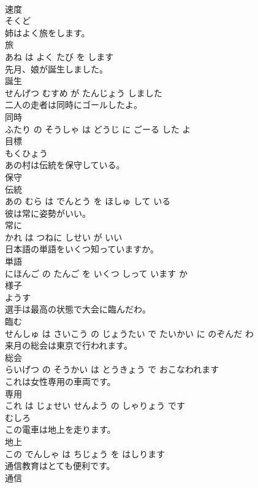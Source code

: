 \documentclass[8pt]{extreport}
\begin{document}
\begin{CJK}{UTF8}{min}
\\	速度	
\\	そくど		
\\	姉はよく旅をします。	
\\	旅 
\\	あね は よく たび を します			
\\	先月、娘が誕生しました。	
\\	誕生 
\\	せんげつ むすめ が たんじょう しました			
\\	二人の走者は同時にゴールしたよ。	
\\	同時 
\\	ふたり の そうしゃ は どうじ に ごーる した よ			
\\	目標	
\\	もくひょう		
\\	あの村は伝統を保守している。	
\\	保守 
\\	伝統 
\\	あの むら は でんとう を ほしゅ して いる			
\\	彼は常に姿勢がいい。	
\\	常に 
\\	かれ は つねに しせい が いい			
\\	日本語の単語をいくつ知っていますか。	
\\	単語 
\\	にほんご の たんご を いくつ しって います か			
\\	様子	
\\	ようす		
\\	選手は最高の状態で大会に臨んだわ。	
\\	臨む 
\\	せんしゅ は さいこう の じょうたい で たいかい に のぞんだ わ			
\\	来月の総会は東京で行われます。	
\\	総会 
\\	らいげつ の そうかい は とうきょう で おこなわれます			
\\	これは女性専用の車両です。	
\\	専用 
\\	これ は じょせい せんよう の しゃりょう です			
\\	むしろ	
\\	この電車は地上を走ります。	
\\	地上 
\\	この でんしゃ は ちじょう を はしります			
\\	通信教育はとても便利です。	
\\	通信 

\end{CJK}
\end{document}
